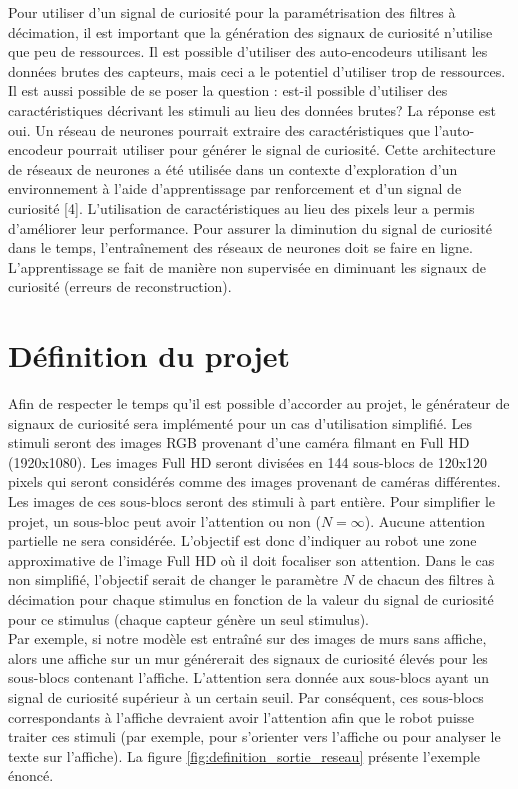     Pour utiliser d’un signal de curiosité pour la paramétrisation des filtres à décimation, il est important que la génération des signaux de curiosité n’utilise que peu de ressources. Il est possible d’utiliser des auto-encodeurs utilisant les données brutes des capteurs, mais ceci a le potentiel d’utiliser trop de ressources. Il est aussi possible de se poser la question : est-il possible d’utiliser des caractéristiques décrivant les stimuli au lieu des données brutes? La réponse est oui. Un réseau de neurones pourrait extraire des caractéristiques que l’auto-encodeur pourrait utiliser pour générer le signal de curiosité. Cette architecture de réseaux de neurones  a été utilisée dans un contexte d’exploration d’un environnement à l’aide d’apprentissage par renforcement et d’un signal de curiosité [4]. L’utilisation de caractéristiques au lieu des pixels leur a permis d’améliorer leur performance. Pour assurer la diminution du signal de curiosité dans le temps, l’entraînement des réseaux de neurones doit se faire en ligne. L’apprentissage se fait de manière non supervisée en diminuant les signaux de curiosité (erreurs de reconstruction).

\section{Définition du projet}
    \label{sec:definition_projet}
    Afin de respecter le temps qu’il est possible d’accorder au projet, le générateur de signaux de curiosité sera implémenté pour un cas d’utilisation simplifié. Les stimuli seront des images RGB provenant d’une caméra filmant en  Full HD (1920x1080). Les images Full HD seront divisées en 144 sous-blocs de 120x120 pixels qui seront considérés comme des images provenant de caméras différentes. Les images de ces sous-blocs seront des stimuli à part entière. Pour simplifier le projet, un sous-bloc peut avoir l’attention ou non (\(N = \infty\)). Aucune attention partielle ne sera considérée. L’objectif est donc d’indiquer au robot une zone approximative de l’image Full HD où il doit focaliser son attention. Dans le cas non simplifié, l’objectif serait de changer le paramètre \(N\) de chacun des filtres à décimation pour chaque stimulus en fonction de la valeur du signal de curiosité pour ce stimulus (chaque capteur génère un seul stimulus).\\
    
    Par exemple, si notre modèle est entraîné sur des images de murs sans affiche, alors une affiche sur un mur générerait des signaux de curiosité élevés pour les sous-blocs contenant l’affiche. L’attention sera donnée aux sous-blocs ayant un signal de curiosité supérieur à un certain seuil. Par conséquent, ces sous-blocs correspondants à l’affiche devraient avoir l’attention afin que le robot puisse traiter ces stimuli (par exemple, pour s’orienter vers l’affiche ou pour analyser le texte sur l’affiche). La figure \ref{fig:definition_sortie_reseau} présente l’exemple énoncé. 
    
